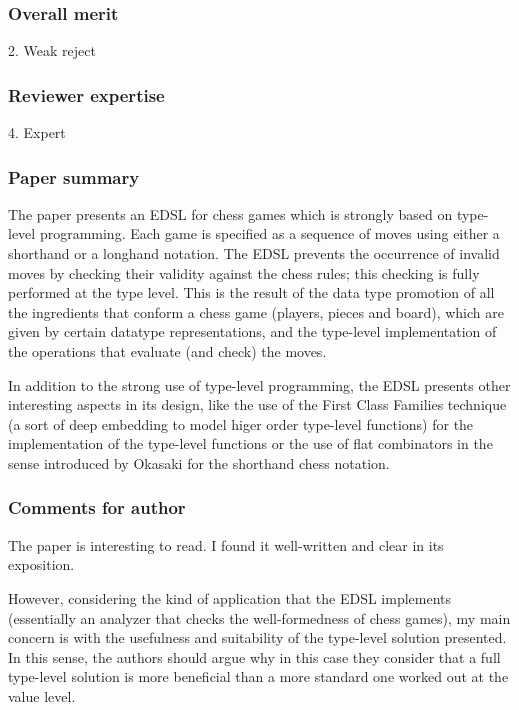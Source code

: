 \subsubsection*{Overall merit}

2. Weak reject

\subsubsection*{Reviewer expertise}

4. Expert

\subsubsection*{Paper summary}

The paper presents an EDSL for chess games which is strongly based on type-level programming. Each game is specified as a sequence of moves using either a shorthand or a longhand notation. The EDSL prevents the occurrence of invalid moves by checking their validity against the chess rules; this checking is fully performed at the type level. This is the result of the data type promotion of all the ingredients that conform a chess game (players, pieces and board), which are given by certain datatype representations, and the type-level implementation of the operations that evaluate (and check) the moves.

In addition to the strong use of type-level programming, the EDSL presents other interesting aspects in its design, like the use of the First Class Families technique (a sort of deep embedding to model higer order type-level functions) for the implementation of the type-level functions or the use of flat combinators in the sense introduced by Okasaki for the shorthand chess notation.

\subsubsection*{Comments for author}

The paper is interesting to read. I found it well-written and clear in its exposition.

However, considering the kind of application that the EDSL implements (essentially an analyzer that checks the well-formedness of chess games), my main concern is with the usefulness and suitability of the type-level solution presented. In this sense, the authors should argue why in this case they consider that a full type-level solution is more beneficial than a more standard one worked out at the value level.

